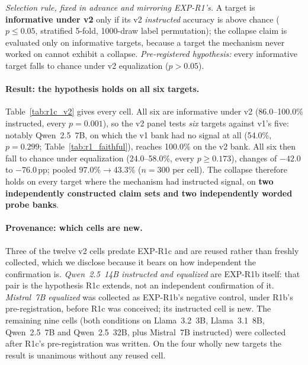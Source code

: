 \emph{Selection rule, fixed in advance and mirroring EXP-R1's.} A target is \textbf{informative under v2} only if its v2 \emph{instructed} accuracy is above chance ($p\!\leq\!0.05$, stratified 5-fold, 1000-draw label permutation); the collapse claim is evaluated only on informative targets, because a target the mechanism never worked on cannot exhibit a collapse. \emph{Pre-registered hypothesis:} every informative target falls to chance under v2 equalization ($p\!>\!0.05$).

\paragraph{Result: the hypothesis holds on all six targets.} Table~\ref{tab:r1c_v2} gives every cell. All six are informative under v2 (86.0--100.0\% instructed, every $p\!=\!0.001$), so the v2 panel tests \emph{six} targets against v1's five: notably Qwen~2.5~7B, on which the v1 bank had no signal at all (54.0\%, $p\!=\!0.299$; Table~\ref{tab:r1_faithful}), reaches 100.0\% on the v2 bank. All six then fall to chance under equalization (24.0--58.0\%, every $p\!\geq\!0.173$), changes of $-42.0$ to $-76.0$\,pp; pooled 97.0\%$\to$43.3\% ($n=300$ per cell). The collapse therefore holds on every target where the mechanism had instructed signal, on \textbf{two independently constructed claim sets and two independently worded probe banks}.

\paragraph{Provenance: which cells are new.} Three of the twelve v2 cells predate EXP-R1c and are reused rather than freshly collected, which we disclose because it bears on how independent the confirmation is. \emph{Qwen~2.5~14B instructed and equalized} are EXP-R1b itself: that pair is the hypothesis R1c extends, not an independent confirmation of it. \emph{Mistral~7B equalized} was collected as EXP-R1b's negative control, under R1b's pre-registration, before R1c was conceived; its instructed cell is new. The remaining nine cells (both conditions on Llama~3.2~3B, Llama~3.1~8B, Qwen~2.5~7B and Qwen~2.5~32B, plus Mistral~7B instructed) were collected after R1c's pre-registration was written. On the four wholly new targets the result is unanimous without any reused cell.


